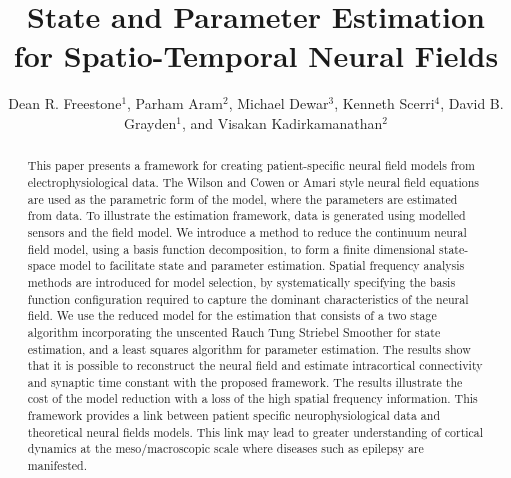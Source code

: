 \documentclass[12pt]{iopart}
\begin{document}

\title[State and Parameter Estimation for Spatio-Temporal Neural Fields]{State and Parameter Estimation for Spatio-Temporal Neural Fields}

\author{Dean R. Freestone$^1$, Parham Aram$^2$, Michael Dewar$^3$, Kenneth Scerri$^4$, David B. Grayden$^1$, and Visakan Kadirkamanathan$^2$}

\address{$^1$ Department of Electrical and Electronic Engineering, University of Melbourne, Melbourne, Vic, 3010 Australia} \address{$^2$ Department of Automatic Control and Systems Engineering, University of Sheffield, Mappin Street, Sheffield, S1 3JD, UK} \address{$^3$ Department of Applied Physics and Applied Mathematics, Columbia University, US} \address{$^4$ Deaprtment of Systems and Control Engeineering, University of Malta, Msida, MSD 1333, Malta}  


\begin{abstract}
	This paper presents a framework for creating patient-specific neural field models from electrophysiological data. The Wilson and Cowen or Amari style neural field equations are used as the parametric form of the model, where the parameters are estimated from data. To illustrate the estimation framework, data is generated using modelled sensors and the field model. We introduce a method to reduce the continuum neural field model, using a basis function decomposition, to form a finite dimensional state-space model to facilitate state and parameter estimation. Spatial frequency analysis methods are introduced for model selection, by systematically specifying the basis function configuration required to capture the dominant characteristics of the neural field. We use the reduced model for the estimation that consists of a two stage algorithm incorporating the unscented Rauch Tung Striebel Smoother for state estimation, and a least squares algorithm for parameter estimation. The results show that it is possible to reconstruct the neural field and estimate intracortical connectivity and synaptic time constant with the proposed framework. The results illustrate the cost of the model reduction with a loss of the high spatial frequency information. This framework provides a link between patient specific neurophysiological data and theoretical neural fields models. This link may lead to greater understanding of cortical dynamics at the meso/macroscopic scale where diseases such as epilepsy are manifested.   
\end{abstract}
\end{document}
